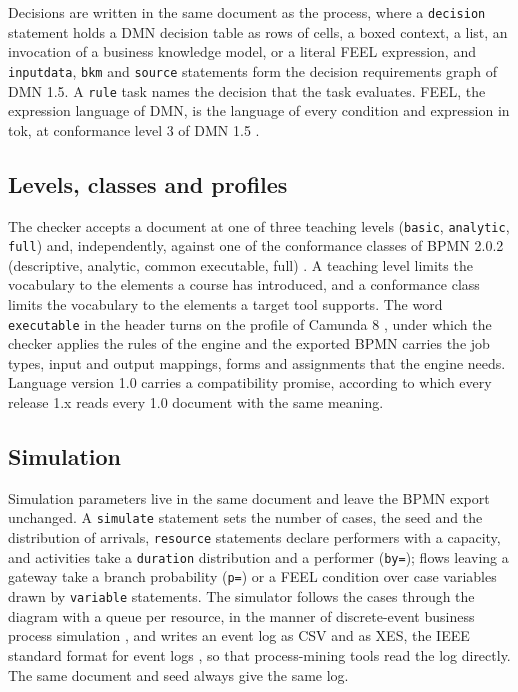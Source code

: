 \documentclass[11pt,a4paper]{article}
\begin{document}
Decisions are written in the same document as the process, where a \texttt{decision} statement holds a DMN decision table as rows of cells, a boxed context, a list, an invocation of a business knowledge model, or a literal FEEL expression, and \texttt{inputdata}, \texttt{bkm} and \texttt{source} statements form the decision requirements graph of DMN 1.5. A \texttt{rule} task names the decision that the task evaluates. FEEL, the expression language of DMN, is the language of every condition and expression in tok, at conformance level 3 of DMN 1.5 \citep{OMG2024DMN}.

\subsection{Levels, classes and profiles}

The checker accepts a document at one of three teaching levels (\texttt{basic}, \texttt{analytic}, \texttt{full}) and, independently, against one of the conformance classes of BPMN 2.0.2 (descriptive, analytic, common executable, full) \citep{OMG2014BPMN}. A teaching level limits the vocabulary to the elements a course has introduced, and a conformance class limits the vocabulary to the elements a target tool supports. The word \texttt{executable} in the header turns on the profile of Camunda 8 \citep{Camunda8}, under which the checker applies the rules of the engine and the exported BPMN carries the job types, input and output mappings, forms and assignments that the engine needs. Language version 1.0 carries a compatibility promise, according to which every release 1.x reads every 1.0 document with the same meaning.

\subsection{Simulation}

Simulation parameters live in the same document and leave the BPMN export unchanged. A \texttt{simulate} statement sets the number of cases, the seed and the distribution of arrivals, \texttt{resource} statements declare performers with a capacity, and activities take a \texttt{duration} distribution and a performer (\texttt{by=}); flows leaving a gateway take a branch probability (\texttt{p=}) or a FEEL condition over case variables drawn by \texttt{variable} statements. The simulator follows the cases through the diagram with a queue per resource, in the manner of discrete-event business process simulation \citep{Aalst2015simulation}, and writes an event log as CSV and as XES, the IEEE standard format for event logs \citep{IEEE1849}, so that process-mining tools read the log directly. The same document and seed always give the same log.
\end{document}
